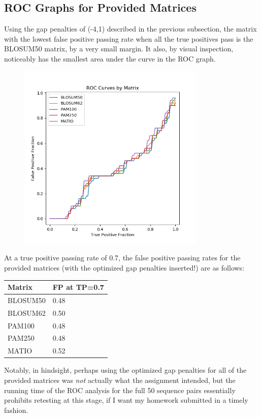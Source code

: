 \documentclass{article}
\begin{document}
\subsection{ROC Graphs for Provided Matrices}
Using the gap penalties of (-4,1) described in the previous subsection, the matrix with the lowest false positive passing rate when all the true positives pass is the BLOSUM50 matrix, by a very small margin. It also, by visual inspection, noticeably has the smallest area under the curve in the ROC graph.
\begin{figure}[h!]
\centering
\includegraphics[width=0.8\textwidth]{ROC.png}
\end{figure}
\par At a true positive passing rate of 0.7, the false positive passing rates for the provided matrices (with the optimized gap penalties inserted!) are as follows:
\begin{center}
	\begin{tabular}{ l || l}
	Matrix & FP at TP=0.7 \\
	\hline
	BLOSUM50 & 0.48 \\
	BLOSUM62 & 0.50 \\
	PAM100 & 0.48 \\
	PAM250 & 0.48 \\
	MATIO & 0.52 \\
	\end{tabular}
\end{center}
Notably, in hindsight, perhaps using the optimized gap penalties for all of the provided matrices was {\it not} actually what the assignment intended, but the running time of the ROC analysis for the full 50 sequence pairs essentially prohibits retesting at this stage, if I want my homework submitted in a timely fashion.
\end{document}

